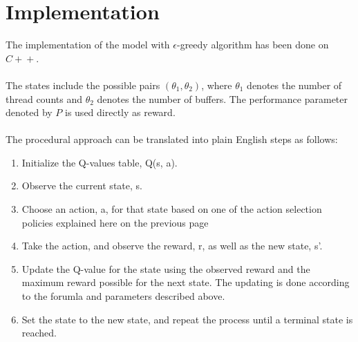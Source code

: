 \documentclass[12pt]{article}
\begin{document}
\section{Implementation}
\label{S:2}
The implementation of the model with $\epsilon$-greedy algorithm has been done on $C\!+\!+$. \\ \\
The states include the possible pairs $(\theta_1,\theta_2)$, where $\theta_1$ denotes the number of thread counts and $\theta_2$ denotes the number of buffers. The performance parameter denoted by $P$ is used directly as reward. \\ \\
The procedural approach can be translated into plain English steps as follows:
\begin{enumerate}
    \item Initialize the Q-values table, Q(s, a).
    \item Observe the current state, s.
    \item Choose an action, a, for that state based on one of the action selection policies explained here on the previous page
    \item Take the action, and observe the reward, r, as well as the new state, s'.
    \item Update the Q-value for the state using the observed reward and the maximum reward possible for the next state. The updating is done according to the forumla and parameters described above.
    \item Set the state to the new state, and repeat the process until a terminal state is reached.
\end{enumerate}

\newpage
\end{document}
